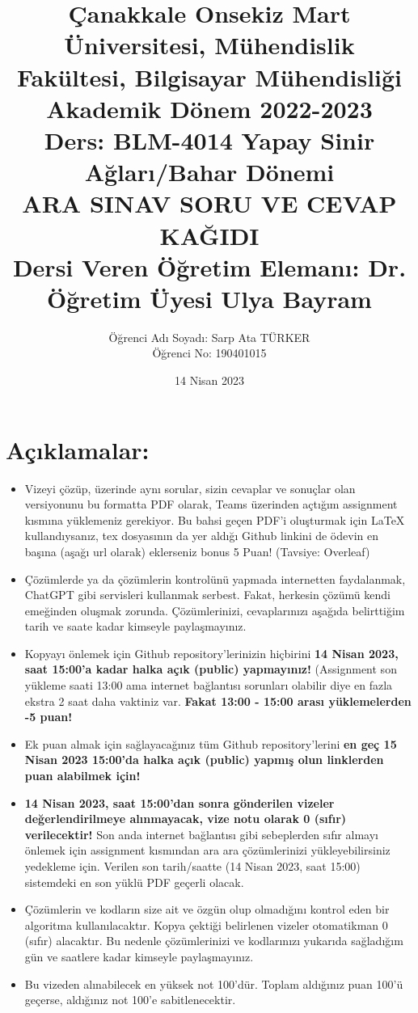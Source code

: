 \documentclass[11pt]{article}
\title{Çanakkale Onsekiz Mart Üniversitesi, Mühendislik Fakültesi, Bilgisayar Mühendisliği Akademik Dönem 2022-2023\\
Ders: BLM-4014 Yapay Sinir Ağları/Bahar Dönemi\\ 
ARA SINAV SORU VE CEVAP KAĞIDI\\
Dersi Veren Öğretim Elemanı: Dr. Öğretim Üyesi Ulya Bayram}
\author{%
\begin{minipage}{\textwidth}
\raggedright
Öğrenci Adı Soyadı: Sarp Ata TÜRKER\\ %
Öğrenci No: 190401015
\end{minipage}%
}
\date{14 Nisan 2023}
\begin{document}
\maketitle

\vspace{-.5in}
\section*{Açıklamalar:}
\begin{itemize}
    \item Vizeyi çözüp, üzerinde aynı sorular, sizin cevaplar ve sonuçlar olan versiyonunu bu formatta PDF olarak, Teams üzerinden açtığım assignment kısmına yüklemeniz gerekiyor. Bu bahsi geçen PDF'i oluşturmak için LaTeX kullandıysanız, tex dosyasının da yer aldığı Github linkini de ödevin en başına (aşağı url olarak) eklerseniz bonus 5 Puan! (Tavsiye: Overleaf)
    \item Çözümlerde ya da çözümlerin kontrolünü yapmada internetten faydalanmak, ChatGPT gibi servisleri kullanmak serbest. Fakat, herkesin çözümü kendi emeğinden oluşmak zorunda. Çözümlerinizi, cevaplarınızı aşağıda belirttiğim tarih ve saate kadar kimseyle paylaşmayınız. 
    \item Kopyayı önlemek için Github repository'lerinizin hiçbirini \textbf{14 Nisan 2023, saat 15:00'a kadar halka açık (public) yapmayınız!} (Assignment son yükleme saati 13:00 ama internet bağlantısı sorunları olabilir diye en fazla ekstra 2 saat daha vaktiniz var. \textbf{Fakat 13:00 - 15:00 arası yüklemelerden -5 puan!}
    \item Ek puan almak için sağlayacağınız tüm Github repository'lerini \textbf{en geç 15 Nisan 2023 15:00'da halka açık (public) yapmış olun linklerden puan alabilmek için!}
    \item \textbf{14 Nisan 2023, saat 15:00'dan sonra gönderilen vizeler değerlendirilmeye alınmayacak, vize notu olarak 0 (sıfır) verilecektir!} Son anda internet bağlantısı gibi sebeplerden sıfır almayı önlemek için assignment kısmından ara ara çözümlerinizi yükleyebilirsiniz yedekleme için. Verilen son tarih/saatte (14 Nisan 2023, saat 15:00) sistemdeki en son yüklü PDF geçerli olacak.
    \item Çözümlerin ve kodların size ait ve özgün olup olmadığını kontrol eden bir algoritma kullanılacaktır. Kopya çektiği belirlenen vizeler otomatikman 0 (sıfır) alacaktır. Bu nedenle çözümlerinizi ve kodlarınızı yukarıda sağladığım gün ve saatlere kadar kimseyle paylaşmayınız.
    \item Bu vizeden alınabilecek en yüksek not 100'dür. Toplam aldığınız puan 100'ü geçerse, aldığınız not 100'e sabitlenecektir.

\end{itemize}
\end{document}
